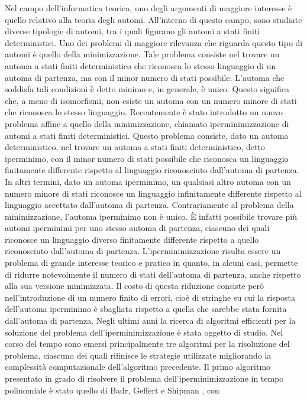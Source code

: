 \documentclass[a4paper,12pt]{report} %
\begin{document}
Nel campo dell'informatica teorica, uno degli argomenti di maggiore interesse è quello relativo alla 
teoria degli automi. All'interno di questo campo, sono studiate diverse tipologie di automi, tra i quali
figurano gli automi a stati finiti deterministici. Uno dei problemi di maggiore rilevanza che riguarda
questo tipo di automi è quello della minimizzazione. Tale problema consiste nel trovare un automa a stati finiti
deterministico che riconosca lo stesso linguaggio di un automa di partenza, ma con il minor numero di 
stati possibile. L'automa che soddisfa tali condizioni è detto minimo e, in generale, è unico.
Questo significa che, a meno di isomorfismi, non esiste un automa con un numero minore di stati che 
riconosca lo stesso linguaggio. Recentemente è stato introdotto un nuovo problema affine a quello
della minimizzazione, chiamato iperminimizzazione di automi a stati finiti deterministici. 
Questo problema consiste, dato un automa deterministico, nel trovare un automa a stati finiti
deterministico, detto iperminimo, con il minor numero di stati possibile che riconosca un linguaggio
finitamente differente rispetto al linguaggio riconosciuto dall'automa di partenza.
In altri termini, dato un automa iperminimo, un qualsiasi altro automa
con un numero minore di stati riconosce un linguaggio infinitamente differente rispetto al linguaggio
accettato dall'automa di partenza.
Contrariamente al problema della minimizzazione, l'automa iperminimo non è unico. È infatti possibile 
trovare più automi iperminimi per uno stesso automa di partenza, ciascuno dei quali
riconosce un linguaggio diverso finitamente differente rispetto a quello riconosciuto dall'automa di partenza.
L'iperminimizzazione risulta essere un problema di grande interesse teorico e pratico in quanto, in 
alcuni casi, permette di ridurre notevolmente il numero di stati dell'automa di partenza, anche rispetto
alla sua versione minimizzata. Il costo di questa riduzione consiste però nell'introduzione di un numero
finito di errori, cioè di stringhe su cui la risposta dell'automa iperminimo è sbagliata rispetto a quella
che sarebbe stata fornita dall'automa di partenza.
Negli ultimi anni la ricerca di algoritmi efficienti per la soluzione del problema dell'iperminimizzazione
è stata oggetto di studio. Nel corso del tempo sono emersi principalmente 
tre algoritmi per la risoluzione del problema, ciascuno dei quali rifinisce le strategie utilizzate migliorando
la complessità computazionale dell'algoritmo precedente. Il primo algoritmo presentato in grado di risolvere
il problema dell'iperminimizzazione in tempo polinomiale è stato quello di Badr, Geffert e Shipman \parencite{BGS09}, con 
\end{document}
